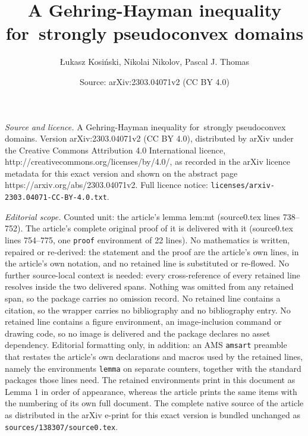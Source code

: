 \documentclass[10pt,a4paper]{amsart}
\title{A Gehring-Hayman inequality for~strongly pseudoconvex domains}
\author{{\L}ukasz Kosi\'nski, Nikolai Nikolov, Pascal J. Thomas}
\date{Source: arXiv:2303.04071v2 (CC BY 4.0)}
\begin{document}
\maketitle

\noindent\emph{Source and licence.} A Gehring-Hayman inequality for~strongly pseudoconvex domains. Version arXiv:2303.04071v2 (CC BY 4.0), distributed by arXiv under the Creative Commons Attribution 4.0 International licence, http://creativecommons.org/licenses/by/4.0/, as recorded in the arXiv licence metadata for this exact version and shown on the abstract page https://arxiv.org/abs/2303.04071v2. Full licence notice: \texttt{licenses/arxiv-2303.04071-CC-BY-4.0.txt}.\par\smallskip

\noindent\textit{Editorial scope.} Counted unit: the article's lemma lem:mt (source0.tex lines 738--752). The article's complete original proof of it is delivered with it (source0.tex lines 754--775, one \texttt{proof} environment of 22 lines). No mathematics is written, repaired or re-derived: the statement and the proof are the article's own lines, in the article's own notation, and no retained line is substituted or re-flowed.  No further source-local context is needed: every cross-reference of every retained line resolves inside the two delivered spans.  Nothing was omitted from any retained span, so the package carries no omission record.  No retained line contains a citation, so the wrapper carries no bibliography and no bibliography entry.  No retained line contains a figure environment, an image-inclusion command or drawing code, so no image is delivered and the package declares no asset dependency.  Editorial formatting only, in addition: an AMS \texttt{amsart} preamble that restates the article's own declarations and macros used by the retained lines, namely the environments \texttt{lemma} on separate counters, together with the standard packages those lines need.  The retained environments print in this document as Lemma 1 in order of appearance, whereas the article prints the same items with the numbering of its own full document.  The complete native source of the article as distributed in the arXiv e-print for this exact version is bundled unchanged as \texttt{sources/138307/source0.tex}.
\end{document}
